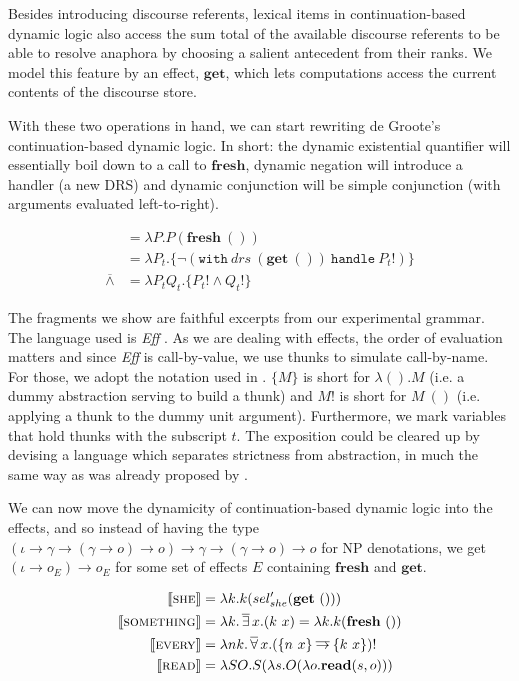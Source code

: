 \documentclass[a4paper,11pt]{easychair}
\newcommand{\dand}{\mathbin{\overline{\land}}}
\newcommand{\dnot}{\mathop{\overline{\lnot}}}
\newcommand{\dimpl}{\mathbin{\overline{\to}}}
\newcommand{\dexists}{\mathop{\overline{\exists}}}
\newcommand{\dforall}{\mathop{\overline{\forall}}}
\newcommand{\sem}[1]{\llbracket #1 \rrbracket}
\newcommand{\keyword}[1]{\texttt{#1}}
\newcommand{\effect}[1]{\textbf{#1}}
\newcommand{\semdom}[1]{\textbf{#1}}
\newcommand{\handle}[2]{\keyword{with}\ #1\ \keyword{handle}\ #2}
\begin{document}
Besides introducing discourse referents, lexical items in continuation-based
dynamic logic also access the sum total of the available discourse referents
to be able to resolve anaphora by choosing a salient antecedent from their
ranks. We model this feature by an effect, $\effect{get}$, which lets
computations access the current contents of the discourse store.

With these two operations in hand, we can start rewriting de Groote's
continuation-based dynamic logic. In short: the dynamic existential quantifier
will essentially boil down to a call to $\effect{fresh}$, dynamic negation
will introduce a handler (a new DRS) and dynamic conjunction will be simple
conjunction (with arguments evaluated left-to-right).

\vspace{-4mm}

\begin{align*}
  \dexists &= \lambda P. P (\effect{fresh}\ ()) \\
  \dnot &= \lambda P_t. \{ \lnot (\handle{drs\ (\effect{get}\ ())}{P_t!}) \} \\
  \dand &= \lambda P_t Q_t. \{ P_t! \land Q_t! \}
\end{align*}

The fragments we show are faithful excerpts from our experimental grammar. The
language used is \emph{Eff} \citep{bauer2012programming}. As we are dealing
with effects, the order of evaluation matters and since \emph{Eff} is
call-by-value, we use thunks to simulate call-by-name. For those, we adopt the
notation used in \citet {kammar2013handlers}. $\{ M \}$ is short for $\lambda
(). M$ (i.e. a dummy abstraction serving to build a thunk) and $M!$ is short
for $M\ ()$ (i.e. applying a thunk to the dummy unit argument). Furthermore,
we mark variables that hold thunks with the subscript $t$. The exposition
could be cleared up by devising a language which separates strictness from
abstraction, in much the same way as was already proposed by
\citet{kiselyov2008call}.

We can now move the dynamicity of continuation-based dynamic logic into the
effects, and so instead of having the type $(\iota \to \gamma \to (\gamma \to
o) \to o) \to \gamma \to (\gamma \to o) \to o$ for NP denotations, we get
$(\iota \to o_E) \to o_E$ for some set of effects $E$ containing
$\effect{fresh}$ and $\effect{get}$.

\vspace{-4mm}

\begin{align*}
  \sem{\textsc{she}} &= \lambda k. k (sel_{she}' (\effect{get}\ ())) \\
  \sem{\textsc{something}} &= \lambda k. \dexists x. (k\ x) = \lambda k. k
  (\effect{fresh}\ ()) \\
  \sem{\textsc{every}} &= \lambda n k. \dforall x. (\{n\ x\} \dimpl \{k\ x\})! \\
  \sem{\textsc{read}} &= \lambda S O. S (\lambda s. O (\lambda
  o. \semdom{read}(s, o)))
\end{align*}
\end{document}
